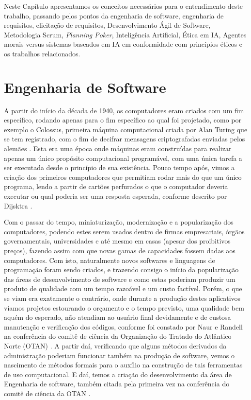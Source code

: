 \label{referencial}

Neste Capítulo apresentamos os conceitos necessários para o entendimento deste trabalho, passando pelos pontos da engenharia de software, engenharia de requisitos, elicitação de requisitos, Desenvolvimento Ágil de Software, Metodologia Scrum, \textit{Planning Poker}, Inteligência Artificial, Ética em \acrshort{IA}, Agentes morais versus sistemas baseados em IA em conformidade com princípios éticos e os trabalhos relacionados.

\section{Engenharia de Software}

 A partir do início da década de 1940, os computadores eram criados com um fim específico, rodando apenas para o fim específico ao qual foi projetado, como por exemplo o Colossus, primeira máquina computacional criada  por Alan Turing que se tem registrado, com o fim de decifrar mensagens criptografadas enviadas pelos alemães \cite{colossus}. Esta era uma época onde máquinas eram construídas para realizar apenas um único propósito computacional programável, com uma única tarefa a ser executada desde o princípio de sua existência. Pouco tempo após, vimos a criação dos primeiros computadores que permitiam rodar mais do que um único programa, lendo a partir de cartões perfurados o que o computador deveria executar ou qual poderia ser uma resposta esperada, conforme descrito por Dijsktra \cite{Humble}. 
 
 Com o passar do tempo, miniaturização, modernização e a popularização dos computadores, podendo estes serem usados dentro de firmas empresariais, órgãos governamentais, universidades e até mesmo em casas (apesar dos proibitivos preços), fazendo assim com que novas gamas de capacidades fossem dadas aos computadores. Com isto, naturalmente novos softwares e linguagens de programação foram sendo criados, e trazendo consigo o início da popularização das áreas de desenvolvimento de software e como estas poderiam produzir um produto de qualidade com um tempo razoável e um custo factível. Porém, o que se viam era exatamente o contrário, onde durante a produção destes aplicativos víamos projetos estourando o orçamento e o tempo previsto, uma qualidade bem aquém do esperado, não atendiam ao usuário final devidamente e de custosa manutenção e verificação dos códigos, conforme foi constado por Naur e Randell na conferência do comitê de ciência da Organização do Tratado do Atlântico Norte (\acrshort{OTAN}) \cite{NATO}. A partir daí, verificando que alguns métodos derivados da administração poderiam funcionar também na produção de software, vemos o nascimento de métodos formais para o auxílio na construção de tais ferramentas de uso computacional. E daí, temos a criação do desenvolvimento da área de Engenharia de software, também citada pela primeira vez na conferência do comitê de ciência da \acrshort{OTAN} \cite{NATO}. 

